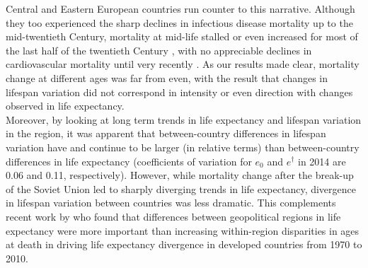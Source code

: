 \documentclass{article}
\begin{document}
\begin{spacing}{1.5}
Central and Eastern European countries run counter to this narrative. Although they too experienced the sharp declines in infectious disease mortality up to the mid-twentieth Century, mortality at mid-life stalled or even increased for most of the last half of the twentieth Century \citep{mckee2001}, with no appreciable declines in cardiovascular mortality until very recently \citep{caselli2002epidemiologic, grigoriev2014recent,mesle2004mortality,Timonin2017}. As our results made clear, mortality change at different ages was far from even, with the result that changes in lifespan variation did not correspond in intensity or even direction with changes observed in life expectancy.\\

Moreover, by looking at long term trends in life expectancy and lifespan variation in the region, it was apparent that between-country differences in lifespan variation have and continue to be larger (in relative terms) than between-country differences in life expectancy (coefficients of variation for $e_0$ and $e^\dagger$ in 2014 are 0.06 and 0.11, respectively). However, while mortality change after the break-up of the Soviet Union led to sharply diverging trends in life expectancy, divergence in lifespan variation between countries was less dramatic. This complements recent work by \citet{timonin2016disparities} who found that differences between geopolitical regions in life expectancy were more important than increasing within-region disparities in ages at death in driving life expectancy divergence in developed countries from 1970 to 2010.\\


\end{spacing}
\end{document}

